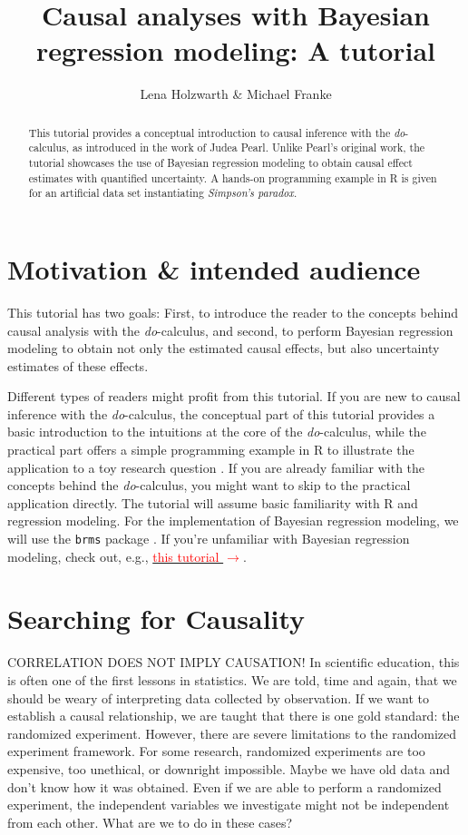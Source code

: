 \documentclass[nobib]{tufte-handout}
\title{Causal analyses with Bayesian regression modeling: A tutorial}
\author{Lena Holzwarth \& Michael Franke}
\date{}
\newcommand{\docalc}{\emph{do}-calculus\xspace}
\begin{document}
\maketitle

\begin{abstract}
\noindent 
This tutorial provides a conceptual introduction to causal inference with the \docalc, as introduced in the work of Judea Pearl.
Unlike Pearl's original work, the tutorial showcases the use of Bayesian regression modeling to obtain causal effect estimates with quantified uncertainty.
A hands-on programming example in R is given for an artificial data set instantiating \emph{Simpson's paradox}.
\end{abstract}

\section{Motivation \& intended audience}

This tutorial has two goals: First, to introduce the reader to the concepts behind causal analysis with the \docalc \citep{pearl2000models}, and second, to perform Bayesian regression modeling to obtain not only the estimated causal effects, but also uncertainty estimates of these effects. 

Different types of readers might profit from this tutorial.
If you are new to causal inference with the \docalc, the conceptual part of this tutorial provides a basic introduction to the intuitions at the core of the \docalc, while the practical part offers a simple programming example in R to illustrate the application to a toy research question \citep{R}. 
If you are already familiar with the concepts behind the \docalc, you might want to skip to the practical application directly. 
The tutorial will assume basic familiarity with R and regression modeling. 
For the implementation of Bayesian regression modeling, we will use the \texttt{brms} package \citep{brms}. 
If you're unfamiliar with Bayesian regression modeling, check out, e.g., \href{https://doi.org/10.31234/osf.io/cdxv3}{{\textcolor{Red}{this tutorial $\rightarrow$}}}.

\section{Searching for Causality}

CORRELATION DOES NOT IMPLY CAUSATION! 
In scientific education, this is often one of the first lessons in statistics. 
We are told, time and again, that we should be weary of interpreting data collected by observation. 
If we want to establish a causal relationship, we are taught that there is one gold standard: the randomized experiment.
However, there are severe limitations to the randomized experiment framework. 
For some research, randomized experiments are too expensive, too unethical, or downright impossible. 
Maybe we have old data and don't know how it was obtained. 
Even if we are able to perform a randomized experiment, the independent variables we investigate might not be independent from each other.
What are we to do in these cases?
\end{document}
